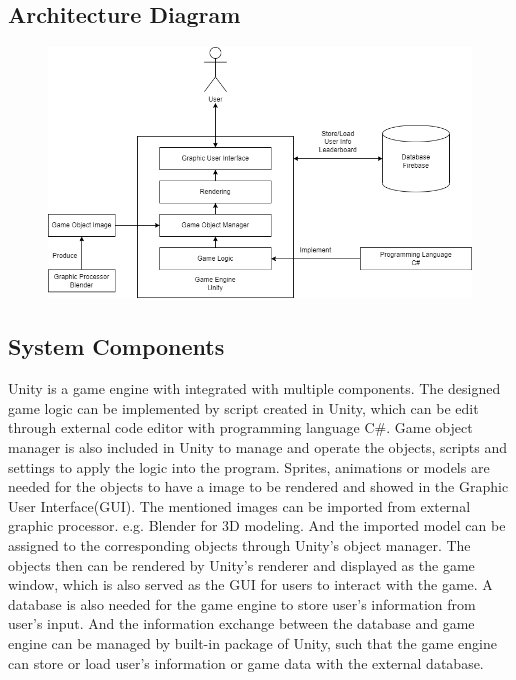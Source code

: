 \documentclass{article}
\begin{document}
\subsection{Architecture Diagram}
\begin{figure}[H]
    \centering
    \includegraphics[width=0.8\linewidth]{ArchitectureDiagram.png}
\end{figure}
\subsection{System Components}
\par Unity is a game engine with integrated with multiple components. The designed game logic can be implemented by script created in Unity, which can be edit through external code editor with programming language C\#. Game object manager is also included in Unity to manage and operate the objects, scripts and settings to apply the logic into the program. Sprites, animations or models are needed for the objects to have a image to be rendered and showed in the Graphic User Interface(GUI). The mentioned images can be imported from external graphic processor. e.g. Blender for 3D modeling. And the imported model can be assigned to the corresponding objects through Unity's object manager. The objects then can be rendered by Unity's renderer and displayed as the game window, which is also served as the GUI for users to interact with the game. A database is also needed for the game engine to store user's information from user's input. And the information exchange between the database and game engine can be managed by built-in package of Unity, such that the game engine can store or load user's information or game data with the external database.
\end{document}

